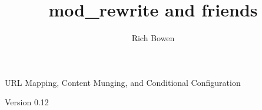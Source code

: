 \documentclass[]{book}
\begin{document}
\title{mod\_rewrite and friends}


\author{Rich Bowen}

\maketitle
URL Mapping, Content Munging, and Conditional Configuration

Version 0.12
\newpage
\frontmatter
\tableofcontents











\newpage
\backmatter
\printindex
\end{document}
